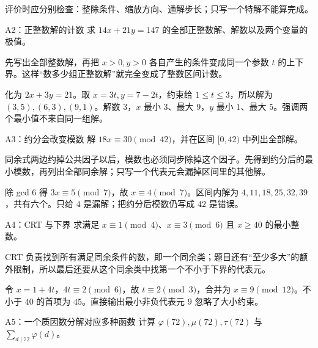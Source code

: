 评价时应分别检查：整除条件、缩放方向、通解步长；只写一个特解不能算完成。


\begin{problem}{A2：正整数解的计数}
求 $14x+21y=147$ 的全部正整数解、解数以及两个变量的极值。
\end{problem}

\begin{pitfall}[讲解：先看这题到底在做什么]
先写出全部整数解，再把 $x>0,y>0$ 各自产生的条件变成同一个参数 $t$ 的上下界。这样“数多少组正整数解”就完全变成了整数区间计数。
\end{pitfall}

\sol 化为 $2x+3y=21$。取 $x=3t,y=7-2t$，约束给 $1\le t\le3$，所以解为 $(3,5),(6,3),(9,1)$。解数 $3$，$x$ 最小 $3$、最大 $9$，$y$ 最小 $1$、最大 $5$。强调两个最小值不来自同一组解。


\begin{problem}{A3：约分会改变模数}
解 $18x\equiv30\pmod{42}$，并在区间 $[0,42)$ 中列出全部解。
\end{problem}

\begin{pitfall}[讲解：先看这题到底在做什么]
同余式两边约掉公共因子以后，模数也必须同步除掉这个因子。先得到约分后的最小模数，再列出全部同余解；只写一个代表元会漏掉区间里的其他解。
\end{pitfall}

\sol 除 gcd $6$ 得 $3x\equiv5\pmod7$，故 $x\equiv4\pmod7$。区间内解为 $4,11,18,25,32,39$，共有六个。只给 $4$ 是漏解；把约分后模数仍写成 $42$ 是错误。


\begin{problem}{A4：CRT 与下界}
求满足 $x\equiv1\pmod4$、$x\equiv3\pmod6$ 且 $x\ge40$ 的最小整数。
\end{problem}

\begin{pitfall}[讲解：先看这题到底在做什么]
CRT 负责找到所有满足同余条件的数，即一个同余类；题目还有“至少多大”的额外限制，所以最后还要从这个同余类中找第一个不小于下界的代表元。
\end{pitfall}

\sol 令 $x=1+4t$，$4t\equiv2\pmod6$，故 $t\equiv2\pmod3$，合并为 $x\equiv9\pmod{12}$。不小于 $40$ 的首项为 $45$。直接输出最小非负代表元 $9$ 忽略了大小约束。


\begin{problem}{A5：一个质因数分解对应多种函数}
计算 $\varphi(72),\mu(72),\tau(72)$ 与 $\sum_{d\mid72}\varphi(d)$。
\end{problem}

